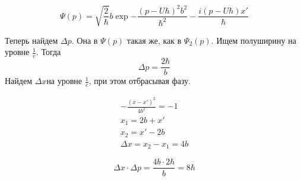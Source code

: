 \begin{equation}
	\Psi(p)=\sqrt{\frac{2}{\hbar}}b\exp{-\frac{(p-U\hbar)^2b^2}{\hbar^2}-\frac{i(p-U\hbar)x'}{\hbar} }
\end{equation}

Теперь найдем $\Delta p$. Она в $\Psi(p)$ такая же, как в $\Psi_2(p)$. Ищем полуширину на уровне $\frac{1}{e}$. Тогда
$$\Delta p=\frac{2\hbar}{b}$$
Найдем $\Delta x$на уровне $\frac1e$, при этом отбрасывая фазу.

\begin{gather*}
	-\frac{(x-x')^2}{4b^2}=-1 \\
	x_1=2b+x'\\
	x_2=x'-2b\\
	\Delta x= x_2-x_1=4b
\end{gather*}

$$\Delta x\cdot \Delta p=\frac{4b\cdot2\hbar}{b}=8\hbar  $$